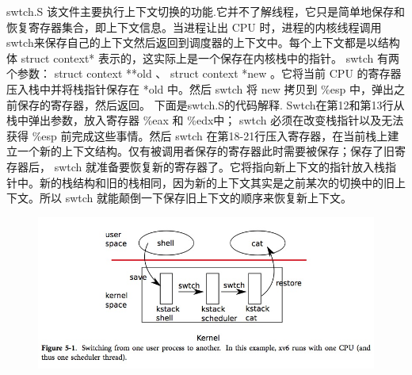 \documentclass[a4paper,12pt]{report}
\begin{document}
swtch.S
该文件主要执行上下文切换的功能.它并不了解线程，它只是简单地保存和恢复寄存器集合，即上下文信息。当进程让出 CPU 时，进程的内核线程调用 swtch来保存自己的上下文然后返回到调度器的上下文中。每个上下文都是以结构体 struct context* 表示的，这实际上是一个保存在内核栈中的指针。 swtch 有两个参数： struct context **old 、 struct context *new 。它将当前 CPU 的寄存器压入栈中并将栈指针保存在 *old 中。然后 swtch 将 new 拷贝到 \%esp 中，弹出之前保存的寄存器，然后返回。
下面是swtch.S的代码解释.
Swtch在第12和第13行从栈中弹出参数，放入寄存器 \%eax 和 \%edx中； swtch 必须在改变栈指针以及无法获得 \%esp 前完成这些事情。然后 swtch 在第18-21行压入寄存器，在当前栈上建立一个新的上下文结构。仅有被调用者保存的寄存器此时需要被保存；保存了旧寄存器后， swtch 就准备要恢复新的寄存器了。它将指向新上下文的指针放入栈指针中。新的栈结构和旧的栈相同，因为新的上下文其实是之前某次的切换中的旧上下文。所以 swtch 就能颠倒一下保存旧上下文的顺序来恢复新上下文。
\begin{figure}[H]
	\centering
	\includegraphics [width=1.0\textwidth]{figure//image115.png}
\end{figure}
\end{document}
